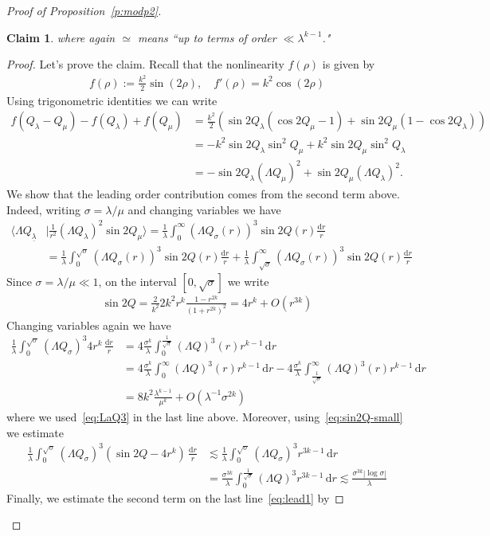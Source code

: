 \documentclass[10pt,reqno]{amsart}
\newcommand{\la}{\lambda}
\newcommand{\s}{\sigma}
\newcommand{\La}{\Lambda}
\newcommand{\abs}[1]{\left\lvert{#1}\right\rvert}
\newcommand{\EQ}[1]{\begin{equation}\begin{split} #1 \end{split}\end{equation}}
\numberwithin{equation}{section}
\newtheorem{claim}[thm]{Claim}
\theoremstyle{remark}
\newcommand{\ula}{\underline{\lambda}}
\newcommand{\ud}{\mathrm{d}}
\newcommand{\0}{\emptyset}
\begin{document}
\begin{proof}[Proof of Proposition~\ref{p:modp2}]
\begin{claim}
where again $\simeq$ means ``up to terms of order $\ll \la^{k-1}$."
\end{claim} 
\begin{proof}
Let's prove the claim. Recall that the nonlinearity $f(\rho)$ is given by 
\EQ{
f(\rho) := \frac{k^2}{2} \sin(2 \rho), \quad f'(\rho) = k^2 \cos(2 \rho)
}
Using trigonometric identities we can write 
\begin{align} 
f(Q_{\la} - Q_\mu) - f(Q_\la) + f(Q_\mu)  &=\frac{k^2}{2} ( \sin2 Q_\la( \cos 2Q_\mu - 1) + \sin 2 Q_\mu( 1 -  \cos 2 Q_\la)) \\
& = - k^2  \sin 2 Q_\la \sin^2 Q_\mu +  k^2 \sin 2 Q_\mu  \sin^2 Q_\la \\
& =  - \sin 2 Q_\la (\La Q_\mu)^2 + \sin 2 Q_\mu (\La Q_\la)^2.     \label{eq:trig1} 
\end{align}
We show that the leading order contribution comes from the second term above. Indeed, writing $\s= \la/ \mu$ and changing variables we have 
\EQ{ \label{eq:lead1} 
\big\langle \La Q_{\ula} &\mid  \frac{1}{r^2}(\La Q_{\la})^2 \sin 2Q_\mu \big\rangle= \frac{1}{ \la} \int_0^\infty ( \La Q_{\s}(r))^3 \sin 2 Q(r) \frac{ \ud r }{r}  \\
& = \frac{1}{\la}  \int_0^{\sqrt{\s}} ( \La Q_{\s}(r))^3 \sin 2 Q(r) \frac{ \ud r }{r}   + \frac{1}{\la}  \int_{\sqrt{\s}}^\infty ( \La Q_{\s}(r))^3 \sin 2 Q(r) \frac{ \ud r }{r} 
}
Since $\s = \la/ \mu  \ll 1$, on the interval $[0, \sqrt{\s}]$ we write 
\EQ{ \label{eq:sin2Q-small} 
\sin 2 Q = \frac{2}{k^2} 2 k^2 r^k \frac{ 1 - r^{2k}}{ (1+ r^{2k})^2} = 4 r^k + O(r^{3k})
}
Changing variables again we have 
\EQ{
\frac{1}{\la} \int_0^{\sqrt{\s}} ( \La Q_{\s})^3 4r^{k} \, \frac{\ud r}{r} &= 4 \frac{\s^k}{\la} \int_0^{\frac{1}{\sqrt{\s}}}  (\La Q)^3(r) r^{k-1} \, \ud r \\
& = 4 \frac{\s^k}{\la} \int_0^\infty  (\La Q)^3(r) r^{k-1} \, \ud r -  4 \frac{\s^k}{\la} \int_{\frac{1}{\sqrt{\s}}}^{\infty}  (\La Q)^3(r) r^{k-1} \, \ud r \\
& = 8k^2\frac{ \la^{k-1} }{\mu^k} + O( \la^{-1}\s^{2k})
}
where we used~\eqref{eq:LaQ3} in the last line above. Moreover, using~\eqref{eq:sin2Q-small} we estimate 
\EQ{
\frac{1}{\la}  \int_0^{\sqrt{\s}}( \La Q_{\s})^3( \sin 2Q - 4r^{k}) \, \frac{\ud r}{r}& \lesssim \frac{1}{\la}  \int_0^{\sqrt{\s}}( \La Q_{\s})^3 r^{3k-1} \, \ud r \\
& = \frac{\s^{3k}}{\la} \int_0^{\frac{1}{\sqrt{\s}}}( \La Q)^3 r^{3k-1} \, \ud r  \lesssim \frac{\s^{3k} \abs{\log \s}}{\la} 
}
Finally, we estimate the second term on the last line~\eqref{eq:lead1} by 

\end{proof}
\end{proof}
\end{document}
